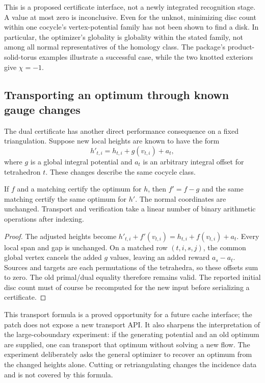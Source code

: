 This is a proposed certificate interface, not a newly integrated recognition
stage. A value at most zero is inconclusive. Even for the unknot, minimizing
disc count within one cocycle's vertex-potential family has not been shown
to find a disk. In particular, the optimizer's globality is globality within
the stated family, not among all normal representatives of the homology class.
The package's product-solid-torus examples illustrate a successful case, while
the two knotted exteriors give $\chi=-1$.

\subsection{Transporting an optimum through known gauge changes}

The dual certificate has another direct performance consequence on a fixed
triangulation. Suppose new local heights are known to have the form
\[
 h'_{t,i}=h_{t,i}+g(v_{t,i})+a_t,
\]
where $g$ is a global integral potential and $a_t$ is an arbitrary integral
offset for tetrahedron $t$. These changes describe the same cocycle class.

\begin{proposition}
If $f$ and a matching certify the optimum for $h$, then $f'=f-g$ and the
same matching certify the same optimum for $h'$. The normal coordinates are
unchanged. Transport and verification take a linear number of binary
arithmetic operations after indexing.
\end{proposition}
\begin{proof}
The adjusted heights become
$h'_{t,i}+f'(v_{t,i})=h_{t,i}+f(v_{t,i})+a_t$. Every local span and gap is
unchanged. On a matched row $(t,i,s,j)$, the common global vertex cancels
the added $g$ values, leaving an added reward $a_s-a_t$. Sources and targets
are each permutations of the tetrahedra, so these offsets sum to zero.
The old primal/dual equality therefore remains valid. The reported initial
disc count must of course be recomputed for the new input before serializing
a certificate.
\end{proof}

This transport formula is a proved opportunity for a future cache interface;
the patch does not expose a new transport API. It also sharpens the
interpretation of the large-coboundary experiment: if the generating
potential and an old optimum are supplied, one can transport that optimum
without solving a new flow. The experiment deliberately asks the general
optimizer to recover an optimum from the changed heights alone. Cutting or
retriangulating changes the incidence data and is not covered by this formula.
